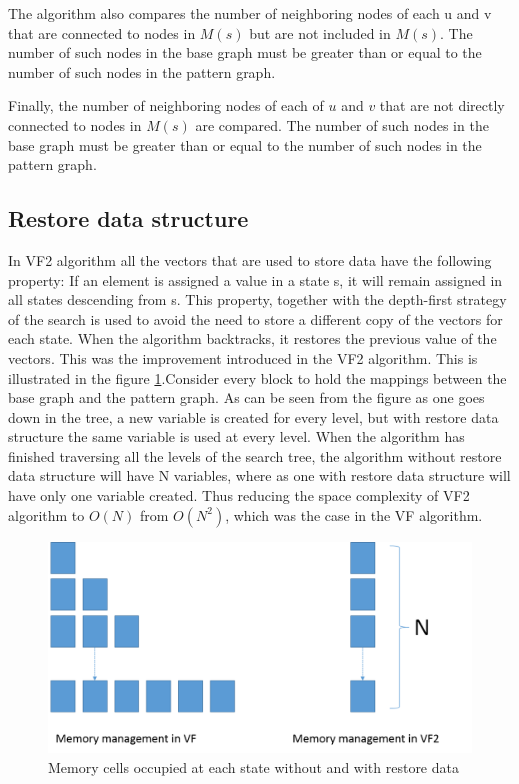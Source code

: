 The algorithm also compares the number of neighboring nodes of each u and v that are connected to nodes in $M(s)$ but are not
included in $M(s)$. The number of such nodes in the base graph must be greater than or equal to the number of such nodes in the pattern graph.

Finally, the number of neighboring nodes of each of $u$ and $v$ that are not directly connected to nodes in $M(s)$ are compared. The number of 
such nodes in the base graph must be greater than or equal to the number of such nodes in the pattern graph.

\subsection{Restore data structure}
In VF2 algorithm all the vectors that are used to store data have the following property: If an element is assigned a value in a state s, it will remain assigned in all states descending from s. This property, together with the depth-first strategy of the search is used to avoid the need to store a different copy of the vectors for each state. When the algorithm backtracks, it restores the previous value of the vectors. This was the improvement introduced in the VF2 algorithm. This is illustrated in the figure \ref{fig:memManagement}.Consider every block to hold the mappings between the base graph and the pattern graph. As can be seen from the figure as one goes down in the tree, a new variable is created for every level, but with restore data structure the same variable is used at every level. When the algorithm has finished traversing all the levels of the search tree, the algorithm without restore data structure will have N variables, where as one with restore data structure will have only one variable created. Thus reducing the space complexity of VF2 algorithm to $O(N)$ from $O(N^2)$, which was the case in the VF algorithm.

\begin{figure}[!ht]
\includegraphics[scale=0.5]{./pics/memManagement.png}
\caption{Memory cells occupied at each state without and with restore data}
\label{fig:memManagement}
\centering
\end{figure}

